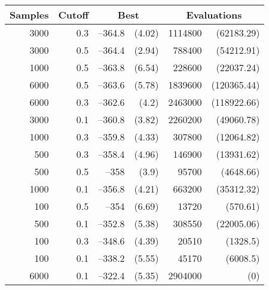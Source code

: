 \begin{table}[tbp]
\centering
\caption{}
\begin{tabular}{|r|r|rr|rr|}
\hline
\multicolumn{1}{|c|}{Samples} & \multicolumn{1}{c|}{Cutoff} &
 \multicolumn{2}{c|}{Best} & 
 \multicolumn{2}{c|}{Evaluations}  \\ \hline
3000 & 0.3 & --364.8 &  (4.02) & 1114800&  (62183.29)\\  \hline
3000 & 0.5 & --364.4 &  (2.94) & 788400 &  (54212.91) \\  \hline
1000 & 0.5 & --363.8 &  (6.54) & 228600 &  (22037.24) \\  \hline
6000 & 0.5 & --363.6 &  (5.78) & 1839600 &  (120365.44) \\   \hline
6000 & 0.3 & --362.6 &  (4.2) & 2463000 &  (118922.66) \\  \hline
3000 & 0.1 & --360.8 &  (3.82) & 2260200 &  (49060.78) \\  \hline
1000 & 0.3 & --359.8 &  (4.33) & 307800 &  (12064.82) \\  \hline
500 & 0.3 & --358.4 &  (4.96) & 146900 &  (13931.62) \\  \hline
500 & 0.5 & --358 &  (3.9) & 95700 &  (4648.66) \\  \hline
1000 & 0.1 & --356.8 &  (4.21) & 663200 &  (35312.32) \\  \hline
100 & 0.5 & --354 &  (6.69) & 13720 &  (570.61) \\  \hline
500 & 0.1 & --352.8 &  (5.38) & 308550 &  (22005.06) \\  \hline
100 & 0.3 & --348.6 &  (4.39) & 20510 &  (1328.5) \\  \hline
100 & 0.1 & --338.2 &  (5.55) & 45170 &  (6008.5) \\  \hline
6000 & 0.1 & --322.4 &  (5.35) & 2904000 &  (0) \\  \hline
\end{tabular}
\label{ann-1d-ising}
\end{table}

